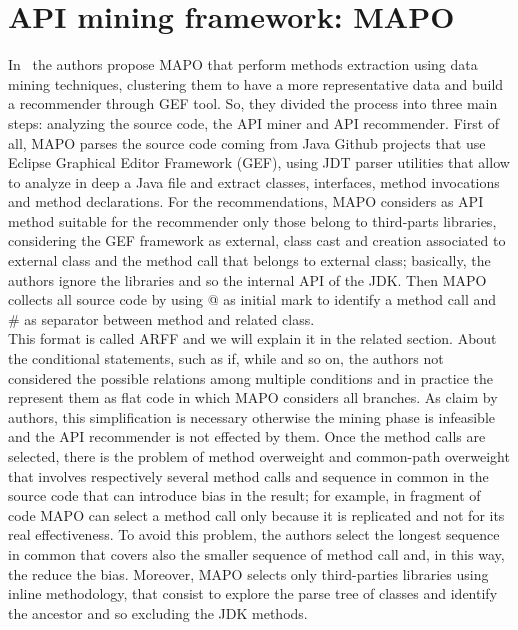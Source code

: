 \section{API mining framework: MAPO}
In~\cite{zhong_mapo:_2009} the authors propose MAPO that perform methods extraction using data mining techniques, clustering them to have a more representative data and build a recommender through GEF tool. So, they divided the process into three main steps: analyzing the source code, the API miner and API recommender. First of all, MAPO parses the source code coming from Java Github projects that use Eclipse Graphical Editor Framework (GEF), using JDT parser utilities that allow to analyze in deep a Java file and extract classes, interfaces, method invocations and method declarations. For the recommendations, MAPO considers as API method suitable for the recommender only those belong to third-parts libraries, considering the GEF framework as external, class cast and creation associated to external class and the method call that belongs to external class; basically, the authors ignore the libraries and so the internal API of the JDK. Then MAPO collects all source code by using @ as initial mark to identify a method call and \# as separator between method and related class. \\
This format is called ARFF and we will explain it in the related section. About the conditional statements, such as if, while and so on, the authors not considered the possible relations among multiple conditions and in practice the represent them as flat code in which MAPO considers all branches. As claim by authors, this simplification is necessary otherwise the mining phase is infeasible and the API recommender is not effected by them. Once the method calls are selected, there is the problem of method overweight and common-path overweight that involves respectively several method calls and sequence in common in the source code that can introduce bias in the result; for example, in fragment of code MAPO can select a method call only because it is replicated and not for its real effectiveness. To avoid this problem, the authors select the longest sequence in common that covers also the smaller sequence of method call and, in this way, the reduce the bias. Moreover, MAPO selects only third-parties libraries using inline methodology, that consist to explore the parse tree of classes and identify the ancestor and so excluding the JDK methods. \newline
